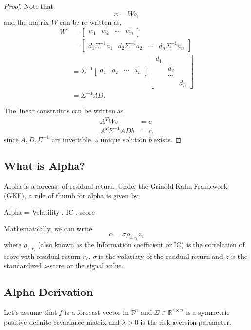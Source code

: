 \documentclass{amsart}
\theoremstyle{plain}
\numberwithin{equation}{section}
\begin{document}
\begin{proof}
Note that
\begin{equation*}
w = Wb,
\end{equation*}
and the matrix $W$ can 
be re-written as,
\begin{align*}
W &= 
\begin{bmatrix}
w_1 & w_2 & \cdots & w_n
\end{bmatrix} \\
&=
\begin{bmatrix}
d_1\Sigma^{-1} a_1 & d_2\Sigma^{-1} a_2 & \cdots & d_n\Sigma^{-1} a_n
\end{bmatrix} \\
&=\Sigma^{-1}
\begin{bmatrix}
a_1 &  a_2 & \cdots &  a_n
\end{bmatrix} 
\begin{bmatrix}
d_1 &  ~     &   ~\\
~     &  d_2 &   ~\\
~     &  \cdots & ~\\
 ~    & ~          & d_n
\end{bmatrix}\\
&= 
\Sigma^{-1} A D.
\end{align*}

The linear constraints can be written as 
\begin{align*}
A^TW b &= c\\
A^T\Sigma^{-1}AD b &= c.
\end{align*}
since $A, D, \Sigma^{-1}$ are invertible, a unique 
solution $b$ exists. 
\end{proof}

\subsection*{What is Alpha?}
Alpha is a forecast of residual return.
Under the Grinold Kahn Framework (GKF), a rule
of thumb for alpha is given by:

Alpha = Volatility . IC . score

Mathematically, we can write 
\begin{equation}
\alpha = \sigma \rho_{z, r_r} z,
\end{equation}
where $\rho_{z,r_r}$ (also known as the 
Information coefficient or IC) is the 
correlation of score with 
residual return $r_r$, $\sigma$ is the 
volatility of the residual return
and $z$ is the standardized $z$-score or the
signal value. 


\subsection*{Alpha Derivation}
Let's assume that $f$ is a forecast vector 
in $\mathbb{R}^n$ and $\Sigma \in \mathbb{R}^{n\times n}$ 
is a symmetric positive definite covariance
matrix and $\lambda > 0$ is the risk aversion 
parameter. 
\end{document}
